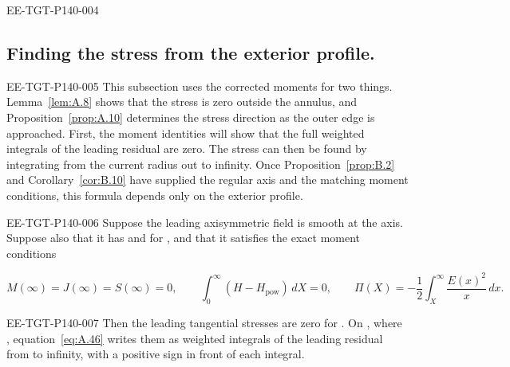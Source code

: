\begin{EESegment}{EE-TGT-P140-004}
\subsection{Finding the stress from the exterior profile.}\label{sec:A.7}
\end{EESegment}
\begin{EESegment}{EE-TGT-P140-005}
This subsection uses the corrected moments for two things. Lemma~\ref{lem:A.8} shows that the stress is zero outside
the annulus, and Proposition~\ref{prop:A.10} determines the stress direction as the outer edge is approached. First, the
moment identities will show that the full weighted integrals of the leading residual are zero. The stress can then be
found by integrating from the current radius out to infinity. Once Proposition~\ref{prop:B.2} and
Corollary~\ref{cor:B.10} have supplied the regular axis and the matching moment conditions, this formula depends only
on the exterior profile.
\end{EESegment}

\begin{lemma}\label{lem:A.8}
\begin{EESegment}{EE-TGT-P140-006}
Suppose the leading axisymmetric field is smooth at the axis. Suppose also that it has
 and
 for
, and that it satisfies the exact moment conditions
\end{EESegment}
\[
  M(\infty)=J(\infty)=S(\infty)=0,\qquad
  \int_0^\infty(H-H_{\mathrm{pow}})\,dX=0,\qquad
  \Pi(X)=-\frac12\int_X^\infty\frac{E(x)^2}{x}\,dx.
\]
\begin{EESegment}{EE-TGT-P140-007}
Then the leading tangential stresses are zero for . On
, where , equation~\eqref{eq:A.46} writes them as
weighted integrals of the leading residual from  to infinity, with a positive sign in front of
each integral.
\end{EESegment}
\end{lemma}

